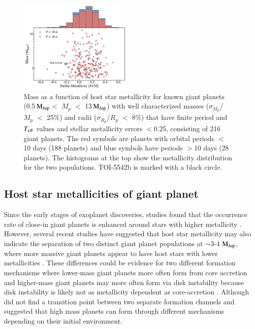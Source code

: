 \documentclass{aa}
\newcommand{\teff}{\ensuremath{T_{\rm eff}}\xspace}
\newcommand{\mjup}{\mbox{$\mathrm{M_{\rm Jup}}$}\xspace}
\begin{document}
\begin{figure}
  \centering
  \includegraphics[width=0.49\textwidth]{figures/mass_metallicity_sep_period.pdf}
 \caption{Mass as a function of host star metallicity for known giant planets (0.5\,\mjup $<$ $M_p$ $<$ 13\,\mjup) with well characterized masses ($\sigma_{M_p}$/$M_p$ $<$ 25\%) and radii ($\sigma_{R_p}$/$R_p$ $<$ 8\%) that have finite period and \teff values and stellar metallicity errors $<$0.25, consisting of 216 giant planets. The red symbols are planets with orbital periods $<$10 days (188 planets) and blue symbols have periods $>$10 days (28 planets). The histograms at the top show the metallicity distribution for the two populations. TOI-5542b is marked with a black circle.}
  \label{fig:mass_metal}
\end{figure}

\subsection{Host star metallicities of giant planet}

Since the early stages of exoplanet discoveries, studies found that the occurrence rate of close-in giant planets is enhanced around stars with higher metallicity \citep[e.g.,][]{Gonzalez1997,Santos2004,Fischer2005,Johnson2010}. However, several recent studies have suggested that host star metallicity may also indicate the separation of two distinct giant planet populations at $\sim$3-4 \mjup, where more massive giant planets appear to have host stars with lower metallicities \citep[e.g.,][]{Santos2017,Schlaufman2018,Maldonado2019,GodaMatsuo2019}. These differences could be evidence for two different formation mechanisms where lower-mass giant planets more often form from core accretion \citep{Pollack1996} and higher-mass giant planets may more often form via disk instability \citep{Boss1997} because disk instability is likely not as metallicity dependent as core-accretion \citep{Boss2002,Cai2006}. Although \citet{Adibekyan2019} did not find a transition point between two separate formation channels and suggested that high mass planets can form through different mechanisms depending on their initial environment. 
\end{document}
